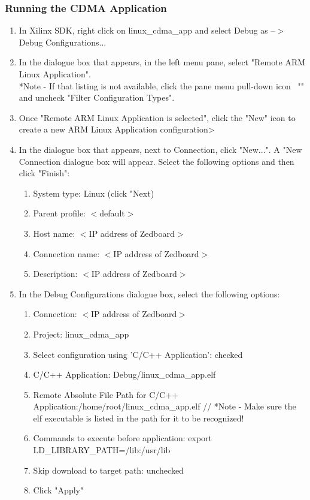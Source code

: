 \documentclass[12pt]{article}
\begin{document}
\subsubsection{Running the CDMA Application}
\begin{enumerate}
\item In Xilinx SDK, right click on linux\_cdma\_app and select Debug as --$>$ Debug Configurations...

\item In the dialogue box that appears, in the left menu pane, select "Remote ARM Linux Application".  \\
*Note - If that listing is not available, click the pane menu pull-down icon \, "\raisebox{-5pt}{\bf\large{\v{}}}" and uncheck "Filter Configuration Types".
\item Once "Remote ARM Linux Application is selected", click the "New" icon to create a new ARM Linux Application configuration>
\item In the dialogue box that appears, next to Connection, click "New...".  A "New Connection dialogue box will appear.  Select the following options and then click "Finish":
\begin{enumerate}
\item System type: Linux (click "Next)
\item Parent profile: $<$default$>$
\item Host name: $<$IP address of Zedboard$>$
\item Connection name: $<$IP address of Zedboard$>$
\item Description: $<$IP address of Zedboard$>$
\end{enumerate}
\item In the Debug Configurations dialogue box, select the following options:
\begin{enumerate}
\item Connection: $<$IP address of Zedboard$>$
\item Project: linux\_cdma\_app
\item Select configuration using 'C/C++ Application': checked
\item C/C++ Application: Debug/linux\_cdma\_app.elf
\item Remote Absolute File Path for C/C++ Application:/home/root/linux\_cdma\_app.elf //
*Note - Make sure the elf executable is listed in the path for it to be recognized!
\item Commands to execute before application: export LD\_LIBRARY\_PATH=/lib:/usr/lib
\item Skip download to target path: unchecked
\item Click "Apply"
\end{enumerate}


\end{enumerate}
\end{document}
